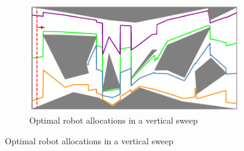 \begin{figure}[t]
\vspace{1.5mm}
    \centering

    \begin{subfigure}[t]{0.7\textwidth}
         \centering
         \includegraphics[width=\textwidth]{chapters/sc/fig/instance_2-eps-converted-to.pdf}
         \caption{Optimal robot allocations in a vertical sweep}
         \label{fig:sc-vertical-exp}
     \end{subfigure}
    
    \medskip
    

\end{figure}
